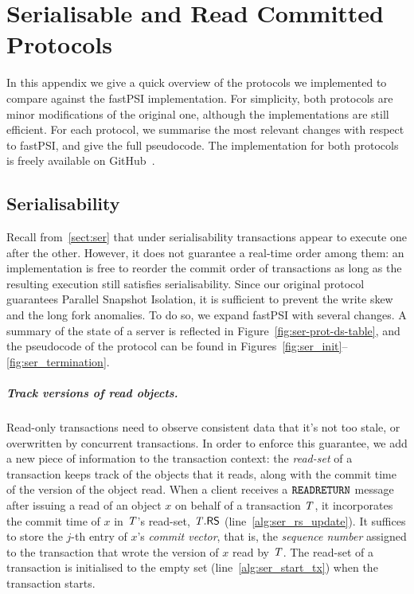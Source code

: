 \cleardoublepage
\chapter{Serialisable and Read Committed Protocols}
\label{appendix:code}

In this appendix we give a quick overview of the protocols we implemented to compare against the fastPSI implementation. For simplicity, both protocols are minor modifications of the original one, although the implementations are still efficient. For each protocol, we summarise the most relevant changes with respect to fastPSI, and give the full pseudocode. The implementation for both protocols is freely available on GitHub~\citep{fastPSIclient, pvc-server}.

\section{Serialisability}
\label{appendix:ser}

Recall from~\ref{sect:ser} that under serialisability transactions appear to execute one after the other. However, it does not guarantee a real-time order among them: an implementation is free to reorder the commit order of transactions as long as the resulting execution still satisfies serialisability. Since our original protocol guarantees Parallel Snapshot Isolation, it is sufficient to prevent the write skew and the long fork anomalies. To do so, we expand fastPSI with several changes. A summary of the state of a server is reflected in Figure~\ref{fig:ser-prot-ds-table}, and the pseudocode of the protocol can be found in Figures~\ref{fig:ser_init}--\ref{fig:ser_termination}.

\paragraph{Track versions of read objects.} Read-only transactions need to observe consistent data that it's not too stale, or overwritten by concurrent transactions. In order to enforce this guarantee, we add a new piece of information to the transaction context: the \emph{read-set} of a transaction keeps track of the objects that it reads, along with the commit time of the version of the object read. When a client receives a ${\tt READRETURN}$ message after issuing a read of an object $x$ on behalf of a transaction $\mathit{T}$, it incorporates the commit time of $x$ in $\mathit{T}$'s read-set, $\mathit{T}.\mathsf{RS}$ (line~\ref{alg:ser_rs_update}). It suffices to store the $j$-th entry of $x$'s \emph{commit vector}, that is, the \emph{sequence number} assigned to the transaction that wrote the version of $x$ read by $\mathit{T}$. The read-set of a transaction is initialised to the empty set (line~\ref{alg:ser_start_tx}) when the transaction starts.

